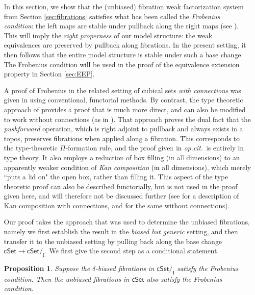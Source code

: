 \documentclass[11pt,reqno]{amsart}
\newcommand{\opcit}{\emph{op.cit.}}
\newcommand{\cSet}{\ensuremath{\mathsf{cSet}}}
\newcommand{\slice}[1]{\ensuremath{/_{\!{#1}}}}
\renewcommand{\to}{\ensuremath{\rightarrow}}
\newcommand{\I}{\ensuremath{\mathrm{I}}}
\newtheorem{proposition}[theorem]{Proposition}
\theoremstyle{remark}
\theoremstyle{definition}
\begin{document}
In this section, we show that the (unbiased) fibration weak factorization system from Section \ref{sec:fibrations} satisfies what has been called the \emph{Frobenius condition}: the left maps are stable under pullback along the right maps (see \cite{van-den-berg-garner}).  This will imply the \emph{right properness} of our model structure: the weak equivalences are preserved by pullback along fibrations.  In the present setting, it then follows that the entire model structure is stable under such a base change.  The Frobenius condition will be used in the proof of the equivalence extension property in Section \ref{sec:EEP}.  

A proof of Frobenius in the related setting of cubical sets \emph{with connections} was given in \cite{GS} using conventional, functorial methods.  By contrast, the type theoretic approach of \cite{CCHM:2018ctt} provides a proof that is much more direct, and can also be modified to work without connections (as in \cite{ABCHFL}).  That approach proves the dual fact that the \emph{pushforward} operation, which is right adjoint to pullback and always exists in a topos, preserves fibrations when applied along a fibration.  This corresponds to the type-theoretic $\Pi$-formation rule, and the proof given in \opcit\ is entirely in type theory.  It also employs a reduction of box filling (in all dimensions) to an apparently weaker condition of \emph{Kan composition} (in all dimensions), which merely ``puts a lid on" the open box, rather than filling it.  This aspect of the type theoretic proof can also be described functorially, but is not used in the proof given here, and will therefore not be discussed further (see \cite{LOPS18} for a description of Kan composition with connections, and \cite{A:composiiton} for the same without connections).

Our proof takes the approach that was used to determine the unbiased fibrations, namely we first establish the result in the \emph{biased but generic} setting, and then transfer it to the unbiased setting by pulling back along the base change $\cSet\to\cSet\slice{\I}$. We first give the second step as a conditional statement.

\begin{proposition}\label{prop:biasedFrobimpliesunbiasedFrob}
Suppose the $\delta$-biased fibrations in $\cSet\slice{\I}$ satisfy the Frobenius condition. Then the unbiased fibrations in $\cSet$ also satisfy the Frobenius condition.
\end{proposition}
\end{document}
